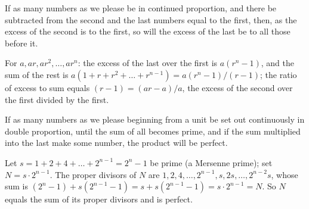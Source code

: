 \begin{claim}
\label{prop:IX.35}
If as many numbers as we please be in continued proportion, and there
be subtracted from the second and the last numbers equal to the
first, then, as the excess of the second is to the first, so will the
excess of the last be to all those before it.
\end{claim}
\begin{evidence}[Proof of IX.35]
\label{ev:IX.35}
For $a, ar, ar^2, \dots, ar^n$: the excess of the last over the
first is $a(r^n - 1)$, and the sum of the rest is $a(1 + r + r^2 +
\dots + r^{n-1}) = a (r^n - 1) / (r - 1)$; the ratio of excess to
sum equals $(r - 1) = (ar - a) / a$, the excess of the second over
the first divided by the first.
\end{evidence}

\begin{claim}
\label{prop:IX.36}
If as many numbers as we please beginning from a unit be set out
continuously in double proportion, until the sum of all becomes
prime, and if the sum multiplied into the last make some number, the
product will be perfect.
\end{claim}
\begin{evidence}[Proof of IX.36]
\label{ev:IX.36}
Let $s = 1 + 2 + 4 + \dots + 2^{n-1} = 2^n - 1$ be prime (a Mersenne
prime); set $N = s \cdot 2^{n-1}$.  The proper divisors of $N$ are
$1, 2, 4, \dots, 2^{n-1}, s, 2s, \dots, 2^{n-2}s$, whose sum is
$(2^n - 1) + s(2^{n-1} - 1) = s + s(2^{n-1} - 1) = s \cdot 2^{n-1}
= N$.  So $N$ equals the sum of its proper divisors and is perfect.
\end{evidence}
